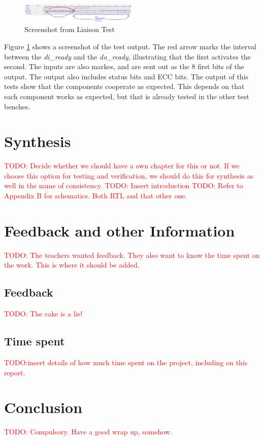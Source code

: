 \documentclass[a4paper]{IEEEtran}
\newcommand\TODO[1]{\textcolor{red}{TODO:#1}}
\newcommand\todo[1]{\TODO{#1}}
\begin{document}
\begin{figure}[h!]
  \centering
      \includegraphics[width=0.5\textwidth]{Figures/Tests/LiaisionTest}
  \caption{Screenshot from Liaison Test}
  \label{fig:LiaisonTests}
\end{figure}

Figure \ref{fig:LiaisonTests} shows a screenshot of the test output.
The red arrow marks the interval between the \textit{di\_ready} and the \textit{do\_ready}, illustrating that the first activates the second.
The inputs are also markes, and are sent out as the 8 first bits of the output.
The output also includes status bits and ECC bits.
The output of this tests show that the components cooperate as expected.
This depends on that each component works as expected, but that is already tested in the other test benches.

\section{Synthesis }
\todo{ Decide whether we should have a own chapter for this or not. If we choose this option for testing and verification, we should do this for synthesis as well in the name of consistency. }
\break
\break
\todo{ Insert introduction }
\break
\break
\todo{ Refer to Appendix B for schematics. Both RTL and that other one. }

\section{Feedback and other Information}
\todo{ The teachers wanted feedback. They also want to know the time spent on the work. This is where it should be added}.
\subsection{Feedback}
\todo{ The cake is a lie!}

\subsection{Time spent}
\todo{insert details of how much time spent on the project, including on this report.}

\section{Conclusion}
\todo{ Compulsory. Have a good wrap up, somehow. }
\end{document}
